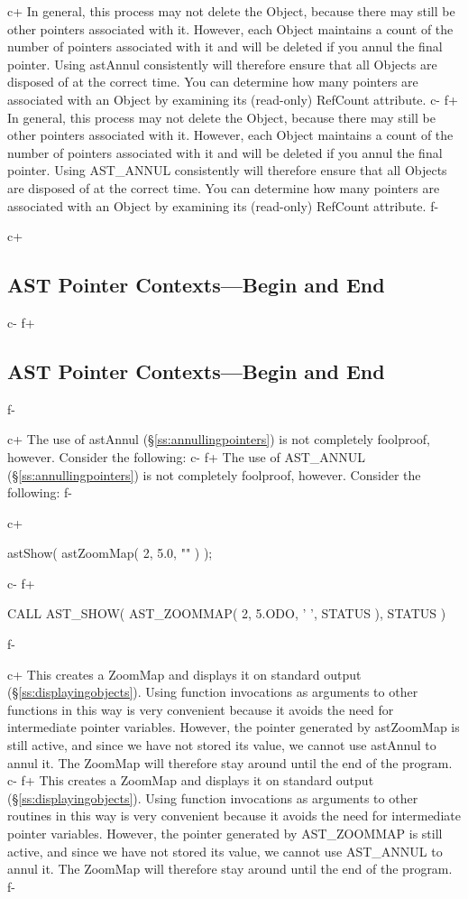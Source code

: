 \documentclass[twoside,11pt]{starlink}
\providecommand{\secref}[1]{\S\ref{#1}}
\begin{document}
c+
In general, this process may not delete the Object, because there may
still be other pointers associated with it. However, each Object
maintains a count of the number of pointers associated with it and
will be deleted if you annul the final pointer. Using astAnnul
consistently will therefore ensure that all Objects are disposed of at
the correct time. You can determine how many pointers are associated
with an Object by examining its (read-only) RefCount attribute.
c-
f+
In general, this process may not delete the Object, because there may
still be other pointers associated with it. However, each Object
maintains a count of the number of pointers associated with it and
will be deleted if you annul the final pointer. Using AST\_ANNUL
consistently will therefore ensure that all Objects are disposed of at
the correct time. You can determine how many pointers are associated
with an Object by examining its (read-only) RefCount attribute.
f-

c+
\subsection{\label{ss:contexts}AST Pointer Contexts---Begin and End}
c-
f+
\subsection{\label{ss:contexts}AST Pointer Contexts---Begin and End}
f-

c+
The use of astAnnul (\secref{ss:annullingpointers}) is not completely
foolproof, however. Consider the following:
c-
f+
The use of AST\_ANNUL (\secref{ss:annullingpointers}) is not completely
foolproof, however. Consider the following:
f-

c+
\small
\begin{terminalv}
astShow( astZoomMap( 2, 5.0, "" ) );
\end{terminalv}
\normalsize
c-
f+
\small
\begin{terminalv}
      CALL AST_SHOW( AST_ZOOMMAP( 2, 5.ODO, ' ', STATUS ), STATUS )
\end{terminalv}
\normalsize
f-

c+
This creates a ZoomMap and displays it on standard output
(\secref{ss:displayingobjects}). Using function invocations as
arguments to other functions in this way is very convenient because it
avoids the need for intermediate pointer variables. However, the
pointer generated by astZoomMap is still active, and since we have not
stored its value, we cannot use astAnnul to annul it. The ZoomMap will
therefore stay around until the end of the program.
c-
f+
This creates a ZoomMap and displays it on standard output
(\secref{ss:displayingobjects}). Using function invocations as
arguments to other routines in this way is very convenient because it
avoids the need for intermediate pointer variables. However, the
pointer generated by AST\_ZOOMMAP is still active, and since we have
not stored its value, we cannot use AST\_ANNUL to annul it. The
ZoomMap will therefore stay around until the end of the program.
f-
\end{document}
